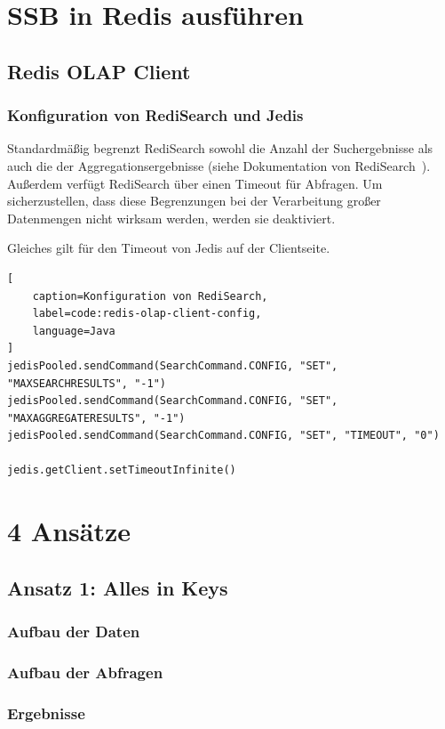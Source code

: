 \section{SSB in Redis ausführen}\label{sec:ssb-use-in-redis}

\subsection{Redis OLAP Client}

\subsubsection{Konfiguration von RediSearch und Jedis}
Standardmäßig begrenzt RediSearch sowohl die Anzahl der Suchergebnisse als auch die der Aggregationsergebnisse (siehe Dokumentation von RediSearch~\cite{redis_ltd_configuration_nodate}). Außerdem verfügt RediSearch über einen Timeout für Abfragen. Um sicherzustellen, dass diese Begrenzungen bei der Verarbeitung großer Datenmengen nicht wirksam werden, werden sie deaktiviert.

Gleiches gilt für den Timeout von Jedis auf der Clientseite.
\begin{lstlisting}[
    caption=Konfiguration von RediSearch,
    label=code:redis-olap-client-config,
    language=Java
]
jedisPooled.sendCommand(SearchCommand.CONFIG, "SET", "MAXSEARCHRESULTS", "-1")
jedisPooled.sendCommand(SearchCommand.CONFIG, "SET", "MAXAGGREGATERESULTS", "-1")
jedisPooled.sendCommand(SearchCommand.CONFIG, "SET", "TIMEOUT", "0")

jedis.getClient.setTimeoutInfinite()
\end{lstlisting}

\section{4 Ansätze}

\subsection{Ansatz 1: Alles in Keys}
\subsubsection{Aufbau der Daten}
\subsubsection{Aufbau der Abfragen}
\subsubsection{Ergebnisse}
